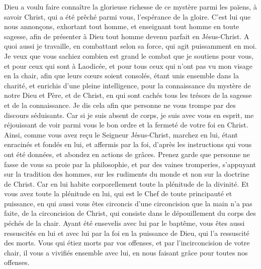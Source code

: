 \begin{multicols}{2}
Dieu a voulu faire connaître la glorieuse richesse de ce mystère parmi les païens, à savoir Christ, qui a été prêché parmi vous, l'espérance de la gloire.
C’est lui que nous annonçons, exhortant tout homme, et enseignant tout homme en toute sagesse, afin de présenter à Dieu tout homme devenu parfait en Jésus-Christ.
A quoi aussi je travaille, en combattant selon sa force, qui agit puissamment en moi.
\VerseOne{}Je veux que vous sachiez combien est grand le combat que je soutiens pour vous, et pour ceux qui sont à Laodicée, et pour tous ceux qui n'ont pas vu mon visage en la chair,
afin que leurs cœurs soient consolés, étant unis ensemble dans la charité, et enrichis d'une pleine intelligence, pour la connaissance du mystère de notre Dieu et Père, et de Christ,
en qui sont cachés tous les trésors de la sagesse et de la connaissance.
Je dis cela afin que personne ne vous trompe par des discours séduisants.
Car si je suis absent de corps, je suis avec vous en esprit, me réjouissant de voir parmi vous le bon ordre et la fermeté de votre foi en Christ.
Ainsi, comme vous avez reçu le Seigneur Jésus-Christ, marchez en lui,
étant enracinés et fondés en lui, et affermis par la foi, d’après les instructions qui vous ont été données, et abondez en actions de grâces.
Prenez garde que personne ne fasse de vous sa proie par la philosophie, et par des vaines tromperies, s’appuyant sur la tradition des hommes, sur les rudiments du monde et non sur la doctrine de Christ.
Car en lui habite corporellement toute la plénitude de la divinité.
Et vous avez toute la plénitude en lui, qui est le Chef de toute principauté et puissance,
en qui aussi vous êtes circoncis d'une circoncision que la main n’a pas faite, de la circoncision de Christ, qui consiste dans le dépouillement du corps des péchés de la chair.
Ayant été ensevelis avec lui par le baptême, vous êtes aussi ressuscités en lui et avec lui par la foi en la puissance de Dieu, qui l'a ressuscité des morts.
Vous qui étiez morts par vos offenses, et par l’incirconcision de votre chair, il vous a vivifiés ensemble avec lui, en nous faisant grâce pour toutes nos offenses.

\end{multicols}
